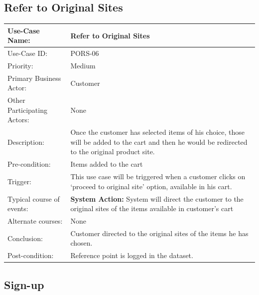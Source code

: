 \subsection{Refer to Original Sites}
\begin{center}
    \begin{tabular}{ @{}|p{7cm}||p{7cm}|  }
    \hline
    Use-Case Name: & Refer to Original Sites  \\ \hline
    Use-Case ID: & PORS-06 \\ \hline
    Priority: & Medium \\ \hline
    Primary Business Actor: & Customer \\ \hline
    Other Participating Actors: & None \\ \hline
    Description: & Once the customer has selected items of his choice, those will be added to the cart and then he would be redirected to the original product site.
 \\ \hline
    Pre-condition: & Items added to the cart \\ \hline
    Trigger: & This use case will be triggered when a customer clicks on ‘proceed to original site’ option, available in his cart. \\ \hline
    Typical course of events: & \textbf{System Action:} \newline System will direct the customer to the original sites of the items available in customer’s cart
 \\ \hline
    Alternate courses: & None\\ \hline
    Conclusion: &  Customer directed to the original sites of the items he has chosen.\\ \hline
    Post-condition: &  Reference point is logged in the dataset. \\ \hline
    \end{tabular}
\end{center}

\subsection{Sign-up}

